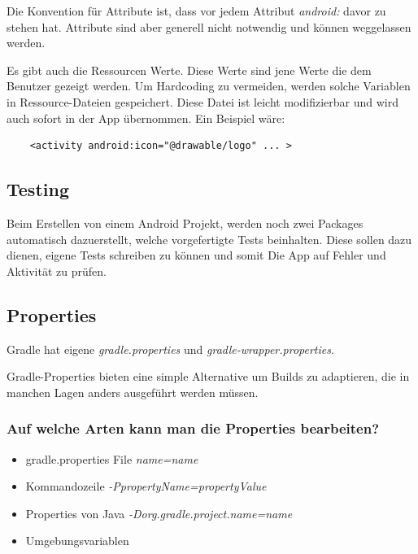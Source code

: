Die Konvention für Attribute ist, dass vor jedem Attribut \textit{android:} davor zu stehen hat. Attribute sind aber 
generell nicht notwendig und können weggelassen werden.

Es gibt auch die Ressourcen Werte. Diese Werte sind jene Werte die dem Benutzer gezeigt werden. Um Hardcoding zu vermeiden,
werden solche Variablen in Ressource-Dateien gespeichert. Diese Datei ist leicht modifizierbar und wird auch 
sofort in der App übernommen. Ein Beispiel wäre:

\begin{lstlisting}
    <activity android:icon="@drawable/logo" ... >
\end{lstlisting}

\subsection{Testing}
Beim Erstellen von einem Android Projekt, werden noch zwei Packages automatisch dazuerstellt, welche vorgefertigte Tests beinhalten. 
Diese sollen dazu dienen, eigene Tests schreiben zu können und somit Die App auf Fehler und Aktivität zu prüfen.

\subsection{Properties}
Gradle hat eigene \textit{gradle.properties} und \textit{gradle-wrapper.properties}.

\cite{Gradle-properties}
Gradle-Properties bieten eine simple Alternative um Builds zu adaptieren,
 die in manchen Lagen anders ausgeführt werden müssen.

\subsubsection{Auf welche Arten kann man die Properties bearbeiten?}

\begin{itemize}
    \item gradle.properties File
    \subitem \textit{name=name }
    \item Kommandozeile
    \subitem \textit{-PpropertyName=propertyValue }
    \item Properties von Java 
    \subitem \textit{-Dorg.gradle.project.name=name}
    \item Umgebungsvariablen
    
\end{itemize}
\pagebreak

